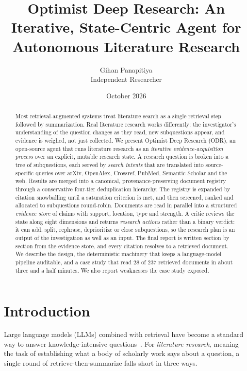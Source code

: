 \documentclass{article}
\title{Optimist Deep Research: An Iterative, State-Centric Agent for Autonomous Literature Research}
\author{
  Gihan Panapitiya \\
  Independent Researcher \\
}
\date{October 2026}
\newcommand{\sys}{ODR}
\newcommand{\sysfull}{Optimist Deep Research}
\begin{document}
\maketitle

\begin{abstract}
Most retrieval-augmented systems treat literature search as a single retrieval step followed by summarization. Real literature research works differently: the investigator's understanding of the question changes as they read, new subquestions appear, and evidence is weighed, not just collected. We present \sysfull{} (\sys{}), an open-source agent that runs literature research as an \emph{iterative evidence-acquisition process} over an explicit, mutable research state. A research question is broken into a tree of subquestions, each served by \emph{search intents} that are translated into source-specific queries over arXiv, OpenAlex, Crossref, PubMed, Semantic Scholar and the web. Results are merged into a canonical, provenance-preserving document registry through a conservative four-tier deduplication hierarchy. The registry is expanded by citation snowballing until a saturation criterion is met, and then screened, ranked and allocated to subquestions round-robin. Documents are read in parallel into a structured \emph{evidence store} of claims with support, location, type and strength. A critic reviews the state along eight dimensions and returns \emph{research actions} rather than a binary verdict: it can add, split, rephrase, deprioritize or close subquestions, so the research plan is an output of the investigation as well as an input. The final report is written section by section from the evidence store, and every citation resolves to a retrieved document. We describe the design, the deterministic machinery that keeps a language-model pipeline auditable, and a case study that read 28 of 237 retrieved documents in about three and a half minutes. We also report weaknesses the case study exposed.
\end{abstract}


\section{Introduction}

Large language models (LLMs) combined with retrieval have become a standard way to answer knowledge-intensive questions~\citep{lewis2020rag}. For \emph{literature research}, meaning the task of establishing what a body of scholarly work says about a question, a single round of retrieve-then-summarize falls short in three ways.
\end{document}
